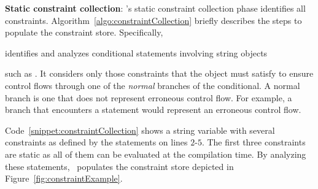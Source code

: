 \begin{mylist}

 \item \textbf{Static constraint collection}: \tool's static constraint
collection phase identifies all constraints.
Algorithm~\ref{algo:constraintCollection} briefly describes the steps to
populate the constraint store. Specifically, \tool\  identifies and analyzes conditional statements involving string
objects  such as . It
considers only those constraints that the object must satisfy to ensure control
flows through one of the \textit{normal} branches of the conditional. A normal
branch is one that does not represent erroneous control flow. For example, a
branch that encounters a statement  would represent an
erroneous control flow. 

Code~\ref{snippet:constraintCollection} shows a string variable with several
constraints as defined by the  statements on lines $2$-$5$. The first
three constraints are static as all of them can be evaluated at the compilation
time. By analyzing these statements, \tool\ populates the constraint store
depicted in Figure~\ref{fig:constraintExample}. 

\begin{algorithm}[t]
\scriptsize
\DontPrintSemicolon
{}
\end{algorithm}
\end{mylist}
